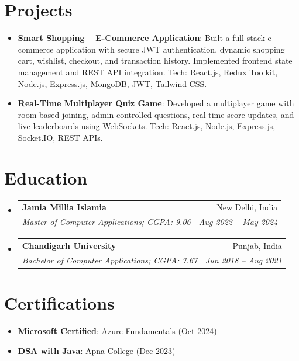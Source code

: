 \documentclass[a4paper,9pt]{article}
\makeatletter
\newcommand{\resumeSubheading}[4]{
  \vspace{-1pt}\item
  \begin{tabular*}{0.97\textwidth}{l@{\extracolsep{\fill}}r}
    \textbf{#1} & #2 \\
    \textit{#3} & \textit{#4} \\
  \end{tabular*}\vspace{-5pt}
}
\newcommand{\resumeSubItem}[2]{
  \item\small{\textbf{#1}: #2 \vspace{-3pt}}
}
\newcommand{\resumeSubHeadingListStart}{
  \begin{itemize}[leftmargin=*,itemsep=1pt,topsep=2pt]
}
\newcommand{\resumeSubHeadingListEnd}{
  \end{itemize}\vspace{-3pt}
}
\makeatother
\begin{document}
\section{\color{BlueViolet} Projects}
\resumeSubHeadingListStart
\resumeSubItem{\color{Blue} Smart Shopping -- E-Commerce Application}
{Built a full-stack e-commerce application with secure JWT authentication, dynamic shopping cart, wishlist, checkout, and transaction history. Implemented frontend state management and REST API integration. Tech: React.js, Redux Toolkit, Node.js, Express.js, MongoDB, JWT, Tailwind CSS.}
\resumeSubItem{\color{Blue} Real-Time Multiplayer Quiz Game}
{Developed a multiplayer game with room-based joining, admin-controlled questions, real-time score updates, and live leaderboards using WebSockets. Tech: React.js, Node.js, Express.js, Socket.IO, REST APIs.}
\resumeSubHeadingListEnd

\section{\color{BlueViolet} Education}
\resumeSubHeadingListStart
\resumeSubheading
{\color{Blue} Jamia Millia Islamia}{New Delhi, India}
{Master of Computer Applications; CGPA: 9.06}{Aug 2022 -- May 2024}
\resumeSubheading
{\color{Blue} Chandigarh University}{Punjab, India}
{Bachelor of Computer Applications; CGPA: 7.67}{Jun 2018 -- Aug 2021}
\resumeSubHeadingListEnd

\section{\color{BlueViolet} Certifications}
\resumeSubHeadingListStart
\resumeSubItem{\color{Blue} Microsoft Certified}{Azure Fundamentals (Oct 2024)}
\resumeSubItem{\color{Blue} DSA with Java}{Apna College (Dec 2023)}
\resumeSubHeadingListEnd
\end{document}
